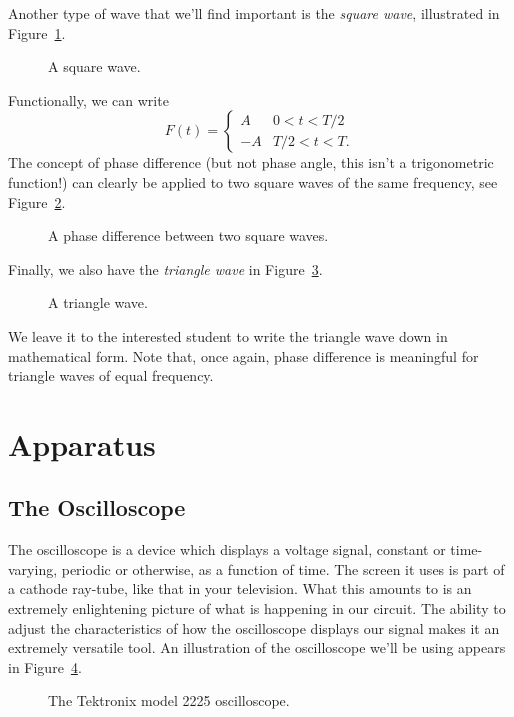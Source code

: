Another type of wave that we'll find important is the {\it square wave}, 
illustrated in Figure~\ref{fig:scope:squarewave}.
\begin{figure}[htb]
\centerline{\epsfxsize=8cm }
\caption{A square wave.}
\label{fig:scope:squarewave}
\end{figure}
Functionally, we can write
$$ F(t) = \left\{ 
\begin{array}{cc} A & 0<t<T/2 \\ -A & T/2<t<T. \end{array} \right. $$
The concept of phase difference (but not phase angle, this isn't a 
trigonometric function!) can clearly be applied to two square waves of the same
frequency, see Figure~\ref{fig:scope:squarephase}.
\begin{figure}[htb]
\centerline{\epsfxsize=8cm }
\caption{A phase difference between two square waves.}
\label{fig:scope:squarephase}
\end{figure}
Finally, we also have the {\it triangle wave} in 
Figure~\ref{fig:scope:triwave}.
\begin{figure}[htb]
\centerline{\epsfxsize=8cm }
\caption{A triangle wave.}
\label{fig:scope:triwave}
\end{figure}
We leave it to the interested student to write the triangle wave down in 
mathematical form. Note that, once again, phase difference is meaningful for
triangle waves of equal frequency.

\section{Apparatus}

\subsection{The Oscilloscope}

The oscilloscope is a device which displays a voltage signal, constant or 
time-varying, periodic or otherwise, as a function of time.  The screen it uses
is part of a cathode ray-tube, like that in your television.  What this amounts
to is an extremely enlightening picture of what is happening in our circuit.
The ability to adjust the characteristics of how the oscilloscope displays our
signal makes it an extremely versatile tool.  An illustration of the 
oscilloscope we'll be using appears in Figure~\ref{fig:scope:oscope}.
\begin{figure}[htb]
\centerline{\epsfxsize=16cm }
\caption{The Tektronix model 2225 oscilloscope.}
\label{fig:scope:oscope}
\end{figure}

